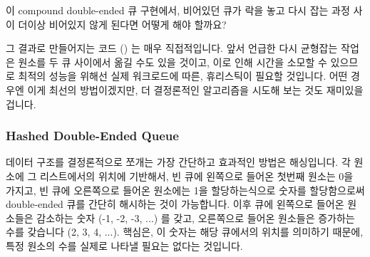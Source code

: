 \QuickQuiz{}
	이 compound double-ended 큐 구현에서, 비어있던 큐가 락을 놓고 다시 잡는
	과정 사이 더이상 비어있지 않게 된다면 어떻게 해야 할까요?

\QuickQuizAnswer{
	이 경우, 그냥 더이상 비어있지 않은 그 큐의 원소를 디큐하고, 락들을
	풀고, 리턴하면 그만입니다.

} \QuickQuizEnd

그 결과로 만들어지는 코드 () 는 매우 직접적입니다.
앞서 언급한 다시 균형잡는 작업은 원소를 두 큐 사이에서 옮길 수도 있을 것이고,
이로 인해 시간을 소모할 수 있으므로 최적의 성능을 위해선 실제 워크로드에 따른,
휴리스틱이 필요할 것입니다.
어떤 경우엔 이게 최선의 방법이겠지만, 더 결정론적인 알고리즘을 시도해 보는 것도
재미있을 겁니다.

\subsubsection{Hashed Double-Ended Queue}
\label{sec:SMPdesign:Hashed Double-Ended Queue}

데이터 구조를 결정론적으로 쪼개는 가장 간단하고 효과적인 방법은 해싱입니다.
각 원소에 그 리스트에서의 위치에 기반해서, 빈 큐에 왼쪽으로 들어온 첫번째
원소는 0을 가지고, 빈 큐에 오른쪽으로 들어온 원소에는 1을 할당하는식으로 숫자를
할당함으로써 double-ended 큐를 간단히 해시하는 것이 가능합니다.
이후 큐에 왼쪽으로 들어온 원소들은 감소하는 숫자 (-1, -2, -3, ...) 를 갖고,
오른쪽으로 들어온 원소들은 증가하는 수를 갖습니다 (2, 3, 4, ...).
핵심은, 이 숫자는 해당 큐에서의 위치를 의미하기 때문에, 특정 원소의 수를 실제로
나타낼 필요는 없다는 것입니다.

